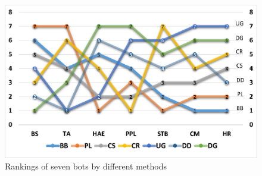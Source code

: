%  


\begin{figure}[th]
\centering
\includegraphics[width=\columnwidth]{rank3.eps}
\caption{Rankings of seven bots by different methods
}
\label{fig:botranks}
\end{figure}


